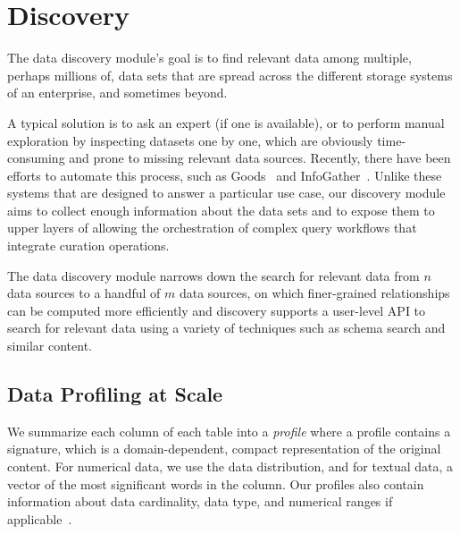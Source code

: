 \section{Discovery}
\label{sec:discovery}

The data discovery module's goal is to find relevant data among multiple,
perhaps millions of, data sets that are spread across the different storage systems of an
enterprise, and sometimes beyond.

A typical solution is to ask an expert (if one is available), or to perform
manual exploration by inspecting datasets one by one, which are obviously
time-consuming and prone to missing relevant data sources.  
Recently, there have been efforts to automate this process, such as
Goods~\cite{DBLP:conf/sigmod/HalevyKNOPRW16} and 
InfoGather~\cite{DBLP:conf/sigmod/YakoutGCC12}. Unlike these systems
that are designed to answer a particular use case, our discovery module aims to
collect enough information about the data sets and to expose them to upper layers
of \dcv allowing the orchestration of complex query workflows that integrate curation operations.

The data discovery module narrows down the search for relevant data from
$n$ data sources to a handful of $m$ data sources, on which finer-grained relationships can be computed more efficiently and
\dcv discovery supports a user-level API to search for relevant data using a
variety of techniques such as schema search and similar content. 

\subsection{Data Profiling at Scale}

We summarize each column of each table into a {\em profile}
where a profile contains a signature, which is a domain-dependent,
compact representation of the original content.  For numerical data, we use the
data distribution, and for textual data,  a vector of the most significant words
in the column.  Our profiles also contain information about data cardinality,
data type, and numerical ranges if applicable~\cite{profiling_survey}.



